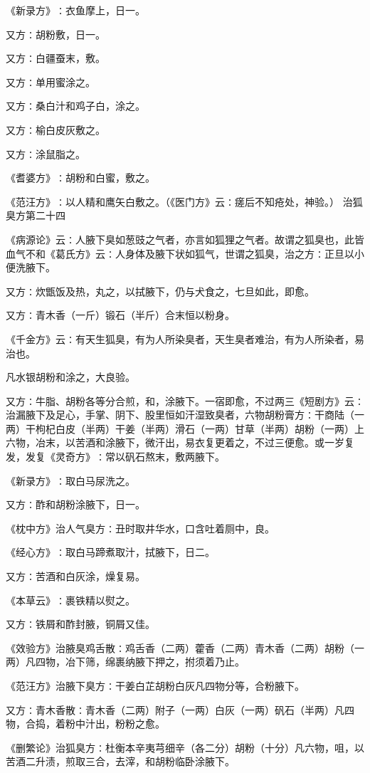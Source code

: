 \documentclass[a4paper,12pt,UTF8,twoside]{ctexbook}
\begin{document}
《新录方》∶衣鱼摩上，日一。

又方∶胡粉敷，日一。

又方∶白疆蚕末，敷。

又方∶单用蜜涂之。

又方∶桑白汁和鸡子白，涂之。

又方∶榆白皮灰敷之。

又方∶涂鼠脂之。

《耆婆方》∶胡粉和白蜜，敷之。

《范汪方》∶以人精和鹰矢白敷之。（《医门方》云∶瘥后不知疮处，神验。）
治狐臭方第二十四

《病源论》云∶人腋下臭如葱豉之气者，亦言如狐狸之气者。故谓之狐臭也，此皆血气不和《葛氏方》云∶人身体及腋下状如狐气，世谓之狐臭，治之方∶正旦以小便洗腋下。

又方∶炊甑饭及热，丸之，以拭腋下，仍与犬食之，七旦如此，即愈。

又方∶青木香（一斤）锻石（半斤）合末恒以粉身。

《千金方》云∶有天生狐臭，有为人所染臭者，天生臭者难治，有为人所染者，易治也。

凡水银胡粉和涂之，大良验。

又方∶牛脂、胡粉各等分合煎，和，涂腋下。一宿即愈，不过两三《短剧方》云∶治漏腋下及足心，手掌、阴下、股里恒如汗湿致臭者，六物胡粉膏方∶干商陆（一两）干枸杞白皮（半两）干姜（半两）滑石（一两）甘草（半两）胡粉（一两）上六物，冶末，以苦酒和涂腋下，微汗出，易衣复更着之，不过三便愈。或一岁复发，发复《灵奇方》∶常以矾石熬末，敷两腋下。

《新录方》∶取白马尿洗之。

又方∶酢和胡粉涂腋下，日一。

《枕中方》治人气臭方∶丑时取井华水，口含吐着厕中，良。

《经心方》∶取白马蹄煮取汁，拭腋下，日二。

又方∶苦酒和白灰涂，燥复易。

《本草云》∶裹铁精以熨之。

又方∶铁屑和酢封腋，铜屑又佳。

《效验方》治腋臭鸡舌散∶鸡舌香（二两）藿香（二两）青木香（二两）胡粉（一两）凡四物，冶下筛，绵裹纳腋下押之，拊须着乃止。

《范汪方》治腋下臭方∶干姜白芷胡粉白灰凡四物分等，合粉腋下。

又方∶青木香散∶青木香（二两）附子（一两）白灰（一两）矾石（半两）凡四物，合捣，着粉中汁出，粉粉之愈。

《删繁论》治狐臭方∶杜衡本辛夷芎细辛（各二分）胡粉（十分）凡六物，咀，以苦酒二升渍，煎取三合，去滓，和胡粉临卧涂腋下。
\end{document}
